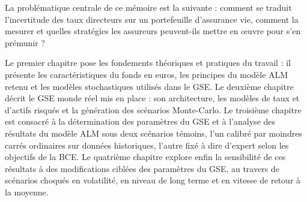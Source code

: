 La problématique centrale de ce mémoire est la suivante : comment se traduit l'incertitude des taux directeurs sur un portefeuille d'assurance vie, comment la mesurer et quelles stratégies les assureurs peuvent-ils mettre en œuvre pour s'en prémunir ? 

Le premier chapitre pose les fondements théoriques et pratiques du travail : il présente les caractéristiques du fonds en euros, les principes du modèle ALM retenu et les modèles stochastiques utilisés dans le GSE. Le deuxième chapitre décrit le GSE monde réel mis en place : son architecture, les modèles de taux et d'actifs risqués et la génération des scénarios Monte-Carlo. Le troisième chapitre est consacré à la détermination des paramètres du GSE et à l'analyse des résultats du modèle ALM sous deux scénarios témoins, l'un calibré par moindres carrés ordinaires sur données historiques, l'autre fixé à dire d'expert selon les objectifs de la BCE. Le quatrième chapitre explore enfin la sensibilité de ces résultats à des modifications ciblées des paramètres du GSE, au travers de scénarios choqués en volatilité, en niveau de long terme et en vitesse de retour à la moyenne.
